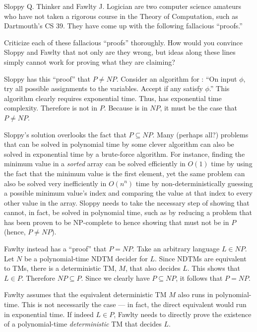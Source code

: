 \begin{problem}
  Sloppy Q. Thinker and Fawlty J. Logician are two computer science
  amateurs who have not taken a rigorous course in the Theory of Computation,
  such as Dartmouth’s CS 39.
  They have come up with the following fallacious ``proofs.''

  Criticize each of these fallacious ``proofs'' thoroughly.
  How would you convince Sloppy and Fawlty that not only are they wrong,
  but ideas along these lines simply cannot work for proving what they are claiming?

  \begin{enumalph}
    \item Sloppy has this ``proof'' that $P \neq NP$.
      Consider an algorithm for \SAT:
      ``On input $\phi$, try all possible assignments to the variables.
      Accept if any satisfy $\phi$.''
      This algorithm clearly requires exponential time.
      Thus, \SAT has exponential time complexity.
      Therefore \SAT is not in $P$.
      Because \SAT is in $NP$, it must be the case that $P \neq NP$.
      \begin{Answer}
        Sloppy's solution overlooks the fact that $P \subseteq NP$.
        Many (perhaps all?) problems that can be solved in polynomial time
        by some clever algorithm can also be solved in exponential time by
        a brute-force algorithm.
        For instance, finding the minimum value in a \emph{sorted} array can be
        solved efficiently in $O(1)$ time by using the fact that the minimum value
        is the first element, yet the same problem can also be solved very inefficiently
        in $O(n^n)$ time by non-deterministically guessing a possible minimum value's index
        and comparing the value at that index to every other value in the array.
        Sloppy needs to take the necessary step of showing that \SAT cannot, in fact,
        be solved in polynomial time, such as by reducing a problem that has been
        proven to be NP-complete to \SAT hence showing that \SAT must not be
        in $P$ (hence, $P \neq NP$).

      \end{Answer}
    \item Fawlty instead has a ``proof'' that $P = NP$.
      Take an arbitrary language $L \in NP$.
      Let $N$ be a polynomial-time NDTM decider for $L$.
      Since NDTMs are equivalent to TMs, there is a deterministic TM, $M$,
      that also decides $L$.
      This shows that $L \in P$. Therefore $NP \subseteq P$.
      Since we clearly have $P \subseteq NP$, it follows that $P = NP$.
      \begin{Answer}
        Fawlty assumes that the equivalent deterministic TM $M$ also runs in
        polynomial-time.
        This is not necessarily the case --- in fact, the direct equivalent
        would run in exponential time. If indeed $L \in P$, Fawlty needs to directly
        prove the existence of a polynomial-time \emph{deterministic} TM that decides $L$.
      \end{Answer}
  \end{enumalph}
\end{problem}

